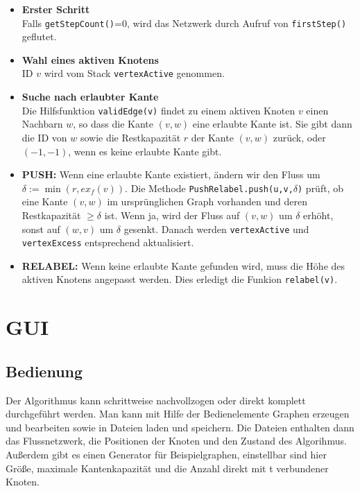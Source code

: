 \documentclass{llncs}
\begin{document}
\begin{itemize}
\item \textbf{Erster Schritt} \\
Falls \texttt{getStepCount()}=0, wird das Netzwerk durch Aufruf von 
\texttt{firstStep()} geflutet.
\item \textbf{Wahl eines aktiven Knotens} \\
ID $v$ wird vom Stack \texttt{vertexActive} genommen. 
\item \textbf{Suche nach erlaubter Kante} \\
Die Hilfsfunktion \texttt{validEdge(v)} findet zu einem aktiven Knoten $v$ einen Nachbarn $w$, so dass die Kante $(v,w)$ eine erlaubte Kante ist. Sie gibt dann die ID von $w$ sowie die Restkapazität $r$ der Kante $(v,w)$ zurück, oder $(-1,-1)$, wenn es keine erlaubte Kante gibt.
\item \textbf{PUSH:} Wenn eine erlaubte Kante existiert, ändern wir den Fluss um 
$\delta := \min (r, ex_f(v))$. 
Die Methode \texttt{PushRelabel.push(u,v,$\delta$)} prüft, ob eine Kante $(v,w)$ im ursprünglichen Graph vorhanden und deren Restkapazität $\geq \delta$ ist. Wenn ja, wird der Fluss auf $(v,w)$ um $\delta$ erhöht, sonst auf $(w,v)$ um $\delta$ gesenkt. Danach werden \texttt{vertexActive} und \texttt{vertexExcess} entsprechend aktualisiert. 
\item \textbf{RELABEL:} 
Wenn keine erlaubte Kante gefunden wird, muss die Höhe des aktiven Knotens angepasst werden. Dies erledigt die Funkion \texttt{relabel(v)}.

\end{itemize}

\section{GUI}

\subsection{Bedienung}

Der Algorithmus kann schrittweise nachvollzogen oder direkt komplett durchgeführt werden. Man kann mit Hilfe der Bedienelemente Graphen erzeugen und bearbeiten sowie in Dateien laden und speichern. Die Dateien enthalten dann das Flussnetzwerk, die Positionen der Knoten und den Zustand des Algorihmus. Außerdem gibt es einen Generator für Beispielgraphen, einstellbar sind hier Größe, maximale Kantenkapazität und die Anzahl direkt mit t verbundener Knoten. 
\end{document}
